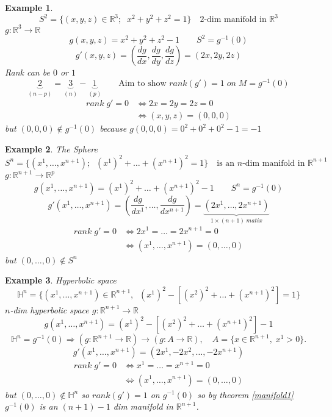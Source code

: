 \documentclass[12pt]{article}
\def\RR{\mathbb{R}}
\newtheorem{example}{Example}[section]
\begin{document}
\begin{example}
\[S^2 = \{(x,y,z) \in \RR^3; \; \;  x^2 + y^2 +z^2 = 1\}\quad \text{$2$-dim manifold in $\RR^3$}\]
$g:\RR^3 \rightarrow \RR$
\[g(x,y,z) = x^2 + y^2 + z^2 - 1 \qquad S^2 = g^{-1}(0)\]
\[g'(x,y,z) = (\frac{dg}{dx}, \frac{dg}{dy}, \frac{dg}{dz}) = (2x, 2y, 2z)\]
Rank can be $0$ or $1$
\[\underbrace{2}_{(n-p)} = \underbrace{3}_{(n)}  - \underbrace{1}_{(p)} \qquad \text{Aim to show } rank(g')=1\; on\; M=g^{-1}(0) \]
\begin{align*}
rank\;g' = 0 &\Leftrightarrow 2x=2y=2z=0\\
&\Leftrightarrow (x,y,z)=(0,0,0)
\end{align*}
but $(0,0,0) \notin g^{-1}(0)$ because $g(0,0,0) = 0^2 + 0^2 +0^2 -1= -1$
\end{example}


\begin{example}The Sphere 
\[S^n = \{(x^1,\dots,x^{n+1}); \; \; ( x^1)^2 + \dots +(x^{n+1})^2  = 1\}\quad \text{is an $n$-dim manifold in $\RR^{n+1}$}\]
$g:\RR^{n+1} \rightarrow \RR^p$
\[g(x^1,\dots,x^{n+1}) =( x^1)^2 + \dots +(x^{n+1})^2  - 1 \qquad S^n = g^{-1}(0)\]
\[g'(x^1,\dots,x^{n+1})  = (\frac{dg}{dx^1},\dots , \frac{dg}{dx^{n+1}}) = \underbrace{(2x^1, \dots, 2x^{n+1})}_{1 \times (n+1)\; matix}\]
\begin{align*}
rank\;g' = 0 &\Leftrightarrow 2x^1=\dots =2x^{n+1}=0\\
&\Leftrightarrow (x^1,\dots ,x^{n+1})=(0,\dots ,0)
\end{align*}
but $(0,\dots ,0) \notin S^n$
\end{example}

\begin{example}Hyperbolic space
\[\mathbb{H}^n = \{(x^1,\dots,x^{n+1}) \in \RR^{n+1},  \; \; ( x^1)^2  - [( x^2)^2 + \dots +(x^{n+1})^2 ] = 1\} \]
$n$-dim hyperbolic space $g:\RR^{n+1} \rightarrow \RR$
\[g(x^1,\dots,x^{n+1}) = ( x^1)^2  - [( x^2)^2 + \dots +(x^{n+1})^2 ] - 1 \]
\[\mathbb{H}^n = g^{-1}(0) \Rightarrow (g:\RR^{n+1} \rightarrow \RR) \rightarrow (g: A \rightarrow \RR), \quad A = \{x \in \RR^{n+1}, \; x^1 > 0 \}. \]
\[g'(x^1,\dots,x^{n+1})  = (2x^1, - 2x^2 , \dots, - 2x^{n+1}) \]
\begin{align*}
rank\;g' = 0 &\Leftrightarrow x^1=\dots =x^{n+1}=0\\
&\Leftrightarrow (x^1,\dots ,x^{n+1})=(0,\dots ,0)
\end{align*}
but $(0,\dots ,0) \notin \mathbb{H}^n$ so $rank (g')= 1$ on $g^{-1}(0)$ so by theorem \ref{manifold1}$g^{-1}(0)$ is an $(n+1)-1$ dim manifold in $\RR^{n+1}$.
\end{example}
\end{document}
